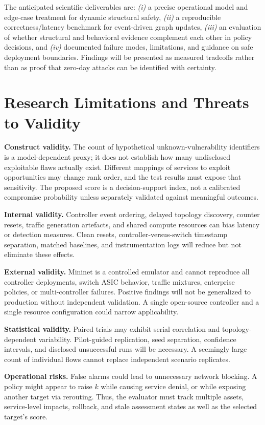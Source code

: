 \documentclass[12pt,a4paper,oneside]{article}
\begin{document}
The anticipated scientific deliverables are: \emph{(i)} a precise operational model and edge-case treatment for dynamic structural safety, \emph{(ii)} a reproducible correctness/latency benchmark for event-driven graph updates, \emph{(iii)} an evaluation of whether structural and behavioral evidence complement each other in policy decisions, and \emph{(iv)} documented failure modes, limitations, and guidance on safe deployment boundaries. Findings will be presented as measured tradeoffs rather than as proof that zero-day attacks can be identified with certainty.

\section{Research Limitations and Threats to Validity}\label{sec:limitations}
\textbf{Construct validity.} The count of hypothetical unknown-vulnerability identifiers is a model-dependent proxy; it does not establish how many undisclosed exploitable flaws actually exist. Different mappings of services to exploit opportunities may change rank order, and the test results must expose that sensitivity. The proposed score is a decision-support index, not a calibrated compromise probability unless separately validated against meaningful outcomes.

\textbf{Internal validity.} Controller event ordering, delayed topology discovery, counter resets, traffic generation artefacts, and shared compute resources can bias latency or detection measures. Clean resets, controller-versus-switch timestamp separation, matched baselines, and instrumentation logs will reduce but not eliminate these effects.

\textbf{External validity.} Mininet is a controlled emulator and cannot reproduce all controller deployments, switch ASIC behavior, traffic mixtures, enterprise policies, or multi-controller failures. Positive findings will not be generalized to production without independent validation. A single open-source controller and a single resource configuration could narrow applicability.

\textbf{Statistical validity.} Paired trials may exhibit serial correlation and topology-dependent variability. Pilot-guided replication, seed separation, confidence intervals, and disclosed unsuccessful runs will be necessary. A seemingly large count of individual flows cannot replace independent scenario replicates.

\textbf{Operational risks.} False alarms could lead to unnecessary network blocking. A policy might appear to raise $k$ while causing service denial, or while exposing another target via rerouting. Thus, the evaluator must track multiple assets, service-level impacts, rollback, and stale assessment states as well as the selected target's score.
\end{document}
